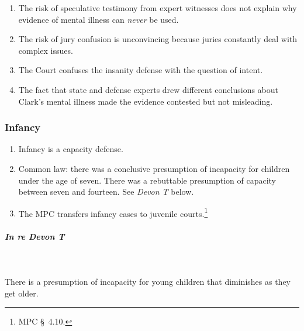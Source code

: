 \begin{enumerate}
\begin{enumerate}
        whether it ``made him unaware that he was shooting a police 
        officer.''\footnote{Casebook p. 668.}
        \item The risk of speculative testimony from expert witnesses does not 
        explain why evidence of mental illness can \emph{never} be used.
        \item The risk of jury confusion is unconvincing because juries 
        constantly deal with complex issues.
        \item The Court confuses the insanity defense with the question of 
        intent.
        \item The fact that state and defense experts drew different 
        conclusions about Clark's mental illness made the evidence contested 
        but not misleading.
    \end{enumerate}
\end{enumerate}

\subsubsection{Infancy}

\begin{enumerate}
    \item Infancy is a capacity defense.
    \item Common law: there was a conclusive presumption of incapacity for 
    children under the age of seven. There was a rebuttable presumption of 
    capacity between seven and fourteen. See \emph{Devon T} below.
    \item The MPC transfers infancy cases to juvenile courts.\footnote{MPC \S\ 
    4.10.}
\end{enumerate}

\paragraph{\emph{In re Devon T}}
~\\\\
There is a presumption of incapacity for young children that diminishes as 
they get older.

